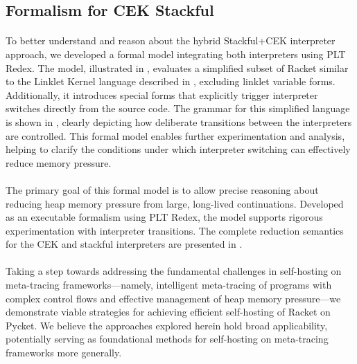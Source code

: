     \subsection{Formalism for CEK \+ Stackful}


      \paragraph{}%
        To better understand and reason about the hybrid Stackful+CEK interpreter approach, we developed a formal model integrating both interpreters using PLT Redex. The model, illustrated in , evaluates a simplified subset of Racket similar to the Linklet Kernel language described in , excluding linklet variable forms. Additionally, it introduces special  forms that explicitly trigger interpreter switches directly from the source code. The grammar for this simplified language is shown in , clearly depicting how deliberate transitions between the interpreters are controlled. This formal model enables further experimentation and analysis, helping to clarify the conditions under which interpreter switching can effectively reduce memory pressure.

      \paragraph{}%
        The primary goal of this formal model is to allow precise reasoning about reducing heap memory pressure from large, long-lived continuations. Developed as an executable formalism using PLT Redex, the model supports rigorous experimentation with interpreter transitions. The complete reduction semantics for the CEK and stackful interpreters are presented in .


      \paragraph{}%
        Taking a step towards addressing the fundamental challenges in self-hosting on meta-tracing frameworks—namely, intelligent meta-tracing of programs with complex control flows and effective management of heap memory pressure—we demonstrate viable strategies for achieving efficient self-hosting of Racket on Pycket. We believe the approaches explored herein hold broad applicability, potentially serving as foundational methods for self-hosting on meta-tracing frameworks more generally.



